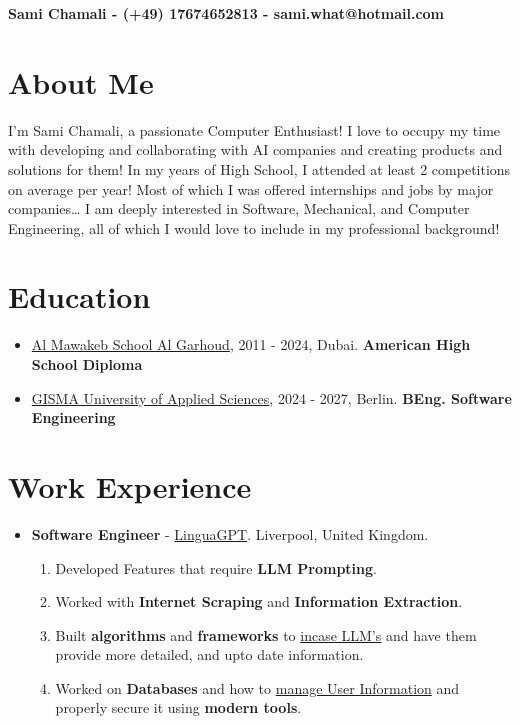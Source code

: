 \documentclass[12pt, letterpaper]{article}
\begin{document}
    \begin{center}
    \textbf{Sami Chamali - (+49) 17674652813 - sami.what@hotmail.com}


    \end{center}
\section{About Me}

I’m Sami Chamali, a passionate Computer Enthusiast! I love to occupy my time with developing and collaborating with AI companies and creating products and solutions for them! In my years of High School, I attended at least 2 competitions on average per year! Most of which I was offered internships and jobs by major companies… I am deeply interested in Software, Mechanical, and Computer Engineering, all of which I would love to include in my professional background!

\section{Education}
    \begin{itemize}
        \item \underline{Al Mawakeb School Al Garhoud}, 2011 - 2024, Dubai. \textbf{American High School Diploma}
        \item \underline{GISMA University of Applied Sciences}, 2024 - 2027, Berlin. \textbf{BEng. Software Engineering}
    \end{itemize}

\section{Work Experience}
    \begin{itemize}
        \item \textbf{Software Engineer} - \underline{LinguaGPT}. Liverpool, United Kingdom.
            \begin{enumerate}
                \item Developed Features that require \textbf{LLM Prompting}.
                \item Worked with \textbf{Internet Scraping} and \textbf{Information Extraction}.
                \item Built \textbf{algorithms} and \textbf{frameworks} to \underline{incase LLM's} and have them provide more detailed, and upto date information.
                \item Worked on \textbf{Databases} and how to \underline{manage User Information} and properly secure it using \textbf{modern tools}.
            \end{enumerate}
    \end{itemize}
\end{document}
